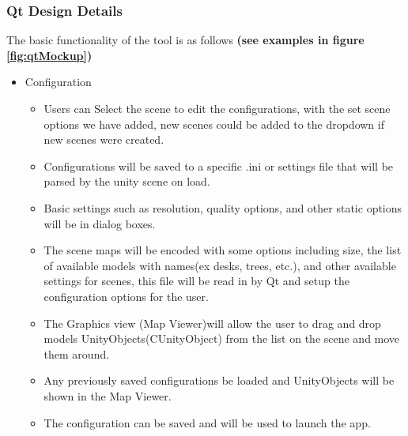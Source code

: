 \documentclass[a4paper,10pt]{article}
\begin{document}
    \subsubsection{Qt Design Details}
	The basic functionality of the tool is as follows \textbf{(see examples in figure \ref{fig:qtMockup})}
\begin{itemize}
\item Configuration
\begin{itemize}
\item Users can Select the scene to edit the configurations, with the set scene options we have added, new scenes could be added to the dropdown if new scenes were created.
\item Configurations will be saved to a specific .ini or settings file that will be parsed by the unity scene on load.
\item Basic settings such as resolution, quality options, and other static options will be in dialog boxes.
\item The scene maps will be encoded with some options including size, the list of available models with names(ex desks, trees, etc.), and other available settings for scenes, this file will be read in by Qt and setup the configuration options for the user.
\item The Graphics view (Map Viewer)will allow the user to drag and drop models UnityObjects(CUnityObject) from the list on the scene and move them around.
\item Any previously saved configurations be loaded and UnityObjects will be shown in the Map Viewer.

\item The configuration can be saved and will be used to launch the app.


\end{itemize}
\end{itemize}
\end{document}
